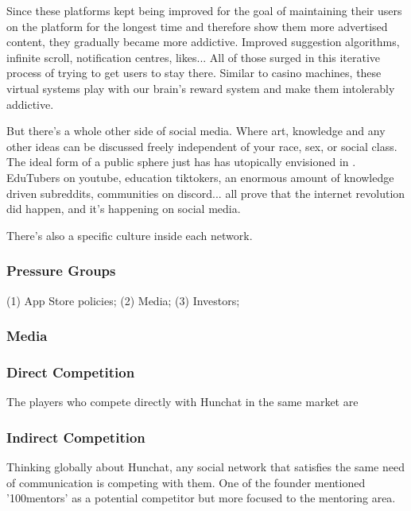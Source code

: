 \documentclass[12pt]{article}
\begin{document}
	 Since these platforms kept being improved for the goal of maintaining their users on the platform for the longest time and therefore show them more advertised content, they gradually became more addictive. Improved suggestion algorithms, infinite scroll, notification centres, likes... All of those surged in this iterative process of trying to get users to stay there. Similar to casino machines, these virtual systems play with our brain's reward system and make them intolerably addictive. 
	 
	 But there's a whole other side of social media. Where art, knowledge and any other ideas can be discussed freely independent of your race, sex, or social class. The ideal form of a public sphere just has \citeauthor{habermas} has utopically envisioned in \citeyear{habermas}. EduTubers on youtube, education tiktokers, an enormous amount of knowledge driven subreddits, communities on discord... all prove that the internet revolution did happen, and it's happening on social media.
	 	 
	 There's also a specific culture inside each network.
	 	
	\subsubsection{Pressure Groups}
	(1) App Store policies; (2) Media; (3) Investors; 
	
	\subsubsection{Media}
	
	\subsubsection{Direct Competition}
	The players who compete directly with Hunchat in the same market are
	
	\subsubsection{Indirect Competition}
	Thinking globally about Hunchat, any social network that satisfies the same need of communication is competing with them. One of the founder mentioned '100mentors' as a potential competitor but more focused to the mentoring area.
	
	
\end{document}

